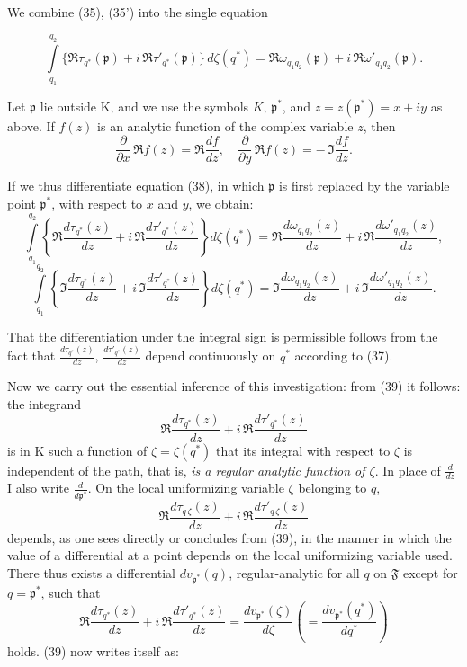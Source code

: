 \documentclass{article}
\begin{document}
We combine (35), (35') into the single equation

\[ \int\limits_{q_1}^{q_2} \{ \Re\tau_{q^*}(\mathfrak{p}) + i\,\Re\tau'_{q^*}(\mathfrak{p}) \} \, d\zeta(q^*) = \Re\omega_{q_1 q_2}(\mathfrak{p}) + i\,\Re\omega'_{q_1 q_2}(\mathfrak{p}). \tag{38} \]

Let $\mathfrak{p}$ lie outside $\mathrm{K}$, and we use the symbols $K$, $\mathfrak{p}^*$, and $z = z(\mathfrak{p}^*) = x + iy$ as above. If $f(z)$ is an analytic function of the complex variable $z$, then
\[ \frac{\partial}{\partial x}\,\Re f(z) = \Re \frac{df}{dz}, \quad \frac{\partial}{\partial y}\,\Re f(z) = -\,\Im \frac{df}{dz}. \]

If we thus differentiate equation (38), in which $\mathfrak{p}$ is first replaced by the variable point $\mathfrak{p}^*$, with respect to $x$ and $y$, we obtain:
\[ \int\limits_{q_1}^{q_2} \left\{ \Re \frac{d\tau_{q^*}(z)}{dz} + i\,\Re \frac{d\tau'_{q^*}(z)}{dz} \right\} d\zeta(q^*) = \Re \frac{d\omega_{q_1 q_2}(z)}{dz} + i\,\Re \frac{d\omega'_{q_1 q_2}(z)}{dz}, \tag{39} \]
\[ \int\limits_{q_1}^{q_2} \left\{ \Im \frac{d\tau_{q^*}(z)}{dz} + i\,\Im \frac{d\tau'_{q^*}(z)}{dz} \right\} d\zeta(q^*) = \Im \frac{d\omega_{q_1 q_2}(z)}{dz} + i\,\Im \frac{d\omega'_{q_1 q_2}(z)}{dz}. \tag{39\,i} \]

That the differentiation under the integral sign is permissible follows from the fact that $\frac{d\tau_{q^*}(z)}{dz}$, $\frac{d\tau'_{q^*}(z)}{dz}$ depend continuously on $q^*$ according to (37).

Now we carry out the essential inference of this investigation: from (39) it follows: the integrand
\[ \Re \frac{d\tau_{q^*}(z)}{dz} + i\,\Re \frac{d\tau'_{q^*}(z)}{dz} \]
is in $\mathrm{K}$ such a function of $\zeta = \zeta(q^*)$ that its integral with respect to $\zeta$ is independent of the path, that is, \emph{is a regular analytic function of $\zeta$}. In place of $\frac{d}{dz}$ I also write $\frac{d}{d\mathfrak{p}^*}$. On the local uniformizing variable $\zeta$ belonging to $q$,
\[ \Re \frac{d\tau_{q\,\zeta}(z)}{dz} + i\,\Re \frac{d\tau'_{q\,\zeta}(z)}{dz} \]
depends, as one sees directly or concludes from (39), in the manner in which the value of a differential at a point depends on the local uniformizing variable used. There thus exists a differential $dv_{\mathfrak{p}^*}(q)$, regular-analytic for all $q$ on $\mathfrak{F}$ except for $q = \mathfrak{p}^*$, such that
\[ \Re \frac{d\tau_{q^*}(z)}{dz} + i\,\Re \frac{d\tau'_{q^*}(z)}{dz} = \frac{dv_{\mathfrak{p}^*}(\zeta)}{d\zeta} \left( = \frac{dv_{\mathfrak{p}^*}(q^*)}{dq^*} \right) \]
holds. (39) now writes itself as:
\end{document}
